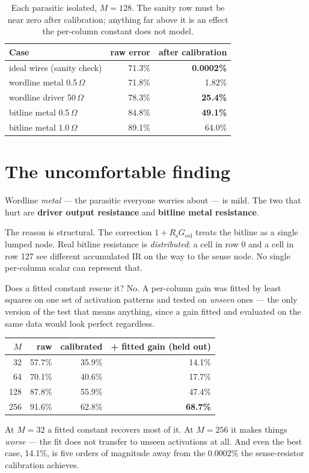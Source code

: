 \documentclass[11pt,a4paper]{report}
\newcommand{\Rs}{R_{\mathrm{s}}}
\newcommand{\Gcol}{G_{\mathrm{col}}}
\begin{document}
\begin{table}[h]
\centering
\caption{Each parasitic isolated, $M{=}128$. The sanity row must be near zero
after calibration; anything far above it is an effect the per-column constant
does not model.}
\begin{tabular}{lrr}
\toprule
Case & raw error & \textbf{after calibration} \\
\midrule
ideal wires (sanity check) & 71.3\% & \textbf{0.0002\%} \\
wordline metal 0.5\,$\Omega$ & 71.8\% & 1.82\% \\
wordline driver 50\,$\Omega$ & 78.3\% & \textbf{25.4\%} \\
bitline metal 0.5\,$\Omega$ & 84.8\% & \textbf{49.1\%} \\
bitline metal 1.0\,$\Omega$ & 89.1\% & 64.0\% \\
\bottomrule
\end{tabular}
\end{table}

\section{The uncomfortable finding}

Wordline \emph{metal} --- the parasitic everyone worries about --- is mild.
The two that hurt are \textbf{driver output resistance} and \textbf{bitline
metal resistance}.

The reason is structural. The correction $1 + \Rs\Gcol$ treats the bitline as
a single lumped node. Real bitline resistance is \emph{distributed}: a cell in
row 0 and a cell in row 127 see different accumulated IR on the way to the
sense node. No single per-column scalar can represent that.

\begin{warnbox}{Does a fitted constant rescue it? No.}
A per-column gain was fitted by least squares on one set of activation
patterns and tested on \emph{unseen} ones --- the only version of the test that
means anything, since a gain fitted and evaluated on the same data would look
perfect regardless.

\begin{center}
\begin{tabular}{rrrr}
\toprule
$M$ & raw & calibrated & + fitted gain (held out) \\
\midrule
32 & 57.7\% & 35.9\% & 14.1\% \\
64 & 70.1\% & 40.6\% & 17.7\% \\
128 & 87.8\% & 55.9\% & 47.4\% \\
256 & 91.6\% & 62.8\% & \textbf{68.7\%} \\
\bottomrule
\end{tabular}
\end{center}

At $M{=}32$ a fitted constant recovers most of it. At $M{=}256$ it makes
things \emph{worse} --- the fit does not transfer to unseen activations at all.
And even the best case, 14.1\%, is five orders of magnitude away from the
0.0002\% the sense-resistor calibration achieves.
\end{warnbox}
\end{document}
